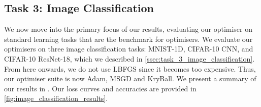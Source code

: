 \subsection{Task 3: Image Classification}
\label{ssec:results_image_classification}

We now move into the primary focus of our results, evaluating our optimiser on standard  learning tasks that are the benchmark for optimisers. We evaluate our optimisers on three image classification tasks: MNIST-1D, CIFAR-10 CNN, and CIFAR-10 ResNet-18, which we described in \cref{ssec:task_3_image_classification}. From here onwards, we do not use LBFGS since it becomes too expensive. Thus, our optimiser suite is now Adam, MSGD and KryBall. We present a summary of our results in . Our loss curves and accuracies are provided in \cref{fig:image_classification_results}. 



